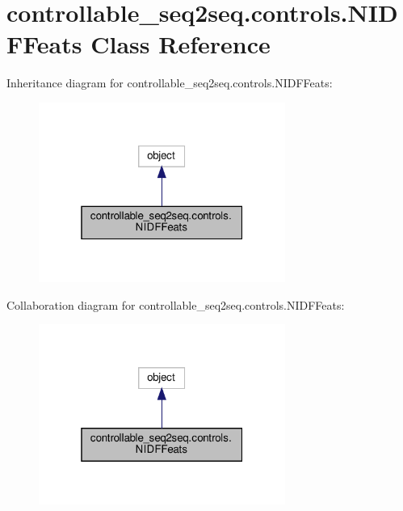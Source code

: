 \hypertarget{classcontrollable__seq2seq_1_1controls_1_1NIDFFeats}{}\section{controllable\+\_\+seq2seq.\+controls.\+N\+I\+D\+F\+Feats Class Reference}
\label{classcontrollable__seq2seq_1_1controls_1_1NIDFFeats}


Inheritance diagram for controllable\+\_\+seq2seq.\+controls.\+N\+I\+D\+F\+Feats\+:
\nopagebreak
\begin{figure}[H]
\begin{center}
\leavevmode
\includegraphics[width=229pt]{classcontrollable__seq2seq_1_1controls_1_1NIDFFeats__inherit__graph}
\end{center}
\end{figure}


Collaboration diagram for controllable\+\_\+seq2seq.\+controls.\+N\+I\+D\+F\+Feats\+:
\nopagebreak
\begin{figure}[H]
\begin{center}
\leavevmode
\includegraphics[width=229pt]{classcontrollable__seq2seq_1_1controls_1_1NIDFFeats__coll__graph}
\end{center}
\end{figure}
